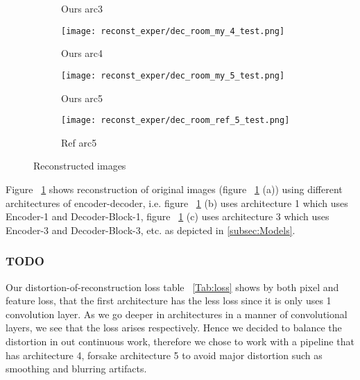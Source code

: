 \begin{figure}[H]
\begin{subfigure}[b]{0.13\linewidth}
		\caption{Ours arc3}
	\end{subfigure}
	\begin{subfigure}[b]{0.13\linewidth}
		\texttt{[image: reconst\_exper/dec\_room\_my\_4\_test.png]} %
		\caption{Ours arc4}
	\end{subfigure}
	\begin{subfigure}[b]{0.13\linewidth}
		\texttt{[image: reconst\_exper/dec\_room\_my\_5\_test.png]} %
		\caption{Ours arc5}
	\end{subfigure}
	\begin{subfigure}[b]{0.13\linewidth}
		\texttt{[image: reconst\_exper/dec\_room\_ref\_5\_test.png]} %
		\caption{Ref arc5}	
	\end{subfigure}
	\caption{Reconstructed images}
	\label{fig:reconstruction}
\end{figure}
Figure ~\ref{fig:reconstruction} shows reconstruction of original images (figure ~\ref{fig:reconstruction} (a)) using different architectures of encoder-decoder, i.e. figure ~\ref{fig:reconstruction} (b) uses architecture 1 which uses Encoder-1 and Decoder-Block-1, figure ~\ref{fig:reconstruction} (c) uses architecture 3 which uses Encoder-3 and Decoder-Block-3, etc. as depicted in \ref{subsec:Models}.

\subsubsection{TODO}
Our distortion-of-reconstruction loss table ~\ref{Tab:loss} shows by both pixel and feature loss, that the first architecture has the less loss since it is only uses 1 convolution layer. As we go deeper in architectures in a manner of convolutional layers, we see that the loss arises respectively. Hence we decided to balance the distortion in out continuous work, therefore we chose to work with a pipeline that has architecture 4, forsake architecture 5 to avoid major distortion such as smoothing and blurring artifacts.

